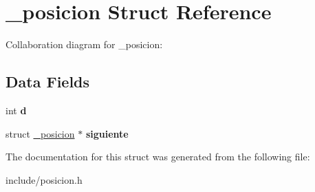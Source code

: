 \hypertarget{struct__posicion}{}\section{\+\_\+posicion Struct Reference}
\label{struct__posicion}


Collaboration diagram for \+\_\+posicion\+:
\subsection*{Data Fields}
\begin{DoxyCompactItemize}
\item 
\mbox{\label{struct__posicion_a6f364afbe132c4ecfea48bde1b0618ba}} 
int {\bfseries d}
\item 
\mbox{\label{struct__posicion_a916d8ad182b7665065545a3aaac1e6d3}} 
struct \hyperlink{struct__posicion}{\+\_\+posicion} $\ast$ {\bfseries siguiente}
\end{DoxyCompactItemize}


The documentation for this struct was generated from the following file\+:\begin{DoxyCompactItemize}
\item 
include/posicion.\+h\end{DoxyCompactItemize}
